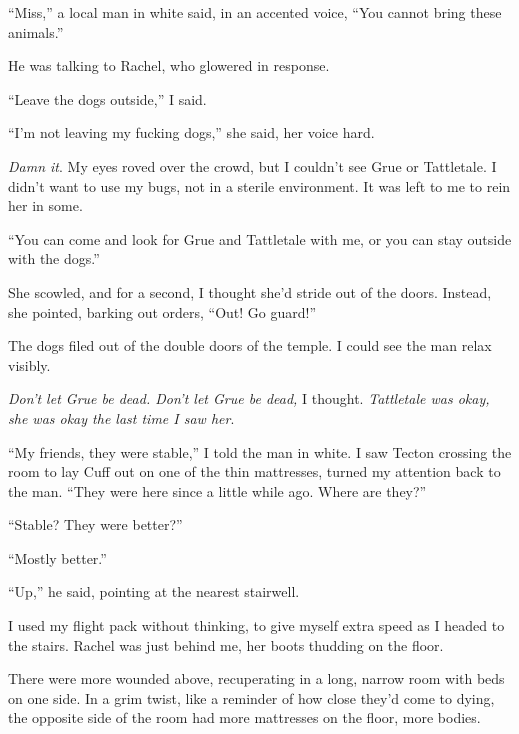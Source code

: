 ``Miss,'' a local man in white said, in an accented voice, ``You cannot bring these animals.''



He was talking to Rachel, who glowered in response.



``Leave the dogs outside,'' I said.



``I'm not leaving my fucking dogs,'' she said, her voice hard.



\emph{Damn it}.  My eyes roved over the crowd, but I couldn't see Grue or Tattletale.  I didn't want to use my bugs, not in a sterile environment.  It was left to me to rein her in some.



``You can come and look for Grue and Tattletale with me, or you can stay outside with the dogs.''



She scowled, and for a second, I thought she'd stride out of the doors.  Instead, she pointed, barking out orders, ``Out!  Go guard!''



The dogs filed out of the double doors of the temple.  I could see the man relax visibly.



\emph{Don't let Grue be dead.  Don't let Grue be dead, }I thought.  \emph{Tattletale was okay, she was okay the last time I saw her}.



``My friends, they were stable,'' I told the man in white.  I saw Tecton crossing the room to lay Cuff out on one of the thin mattresses, turned my attention back to the man.  ``They were here since a little while ago.  Where are they?''



``Stable?  They were better?''



``Mostly better.''



``Up,'' he said, pointing at the nearest stairwell.



I used my flight pack without thinking, to give myself extra speed as I headed to the stairs.  Rachel was just behind me, her boots thudding on the floor.



There were more wounded above, recuperating in a long, narrow room with beds on one side.  In a grim twist, like a reminder of how close they'd come to dying, the opposite side of the room had more mattresses on the floor, more bodies.



